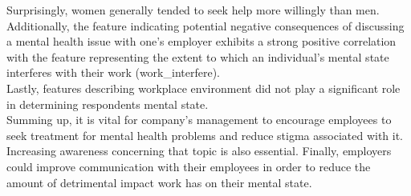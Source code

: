 \documentclass[conference]{IEEEtran}
\begin{document}
Surprisingly, women generally tended to seek help more willingly than men.\\

Additionally, the feature indicating potential negative consequences of discussing a mental health issue with one's employer exhibits a strong positive correlation with the feature representing the extent to which an individual's mental state interferes with their work (work\_interfere).\\

Lastly, features describing workplace environment did not play a significant role in determining respondents mental state.\\

Summing up, it is vital for company's management to encourage employees to seek treatment for mental health problems and reduce stigma associated with it. Increasing awareness concerning that topic is also essential. Finally, employers could improve communication with their employees in order to reduce the amount of detrimental impact work has on their mental state.  




\newpage
\onecolumn
\end{document}
